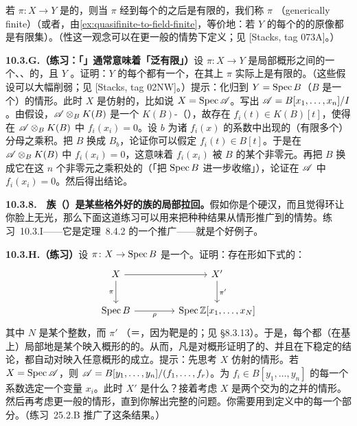 若 $\pi\colon X\to Y$ 是\trFiniteType{}的，则当 $\pi$ 经\trBaseChange{}到每个\trIrreducibleComponent{}的\trGenericPoint{}之后是有限的，我们称 $\pi$ \textbf{\trGenericallyFinite{}}（generically finite）（或者，由\cref{ex:quasifinite-to-field-finite}，等价地：若 $Y$ 的每个\trIrreducibleComponent{}的\trGenericPoint{}的原像都是有限集）。（\trGenericallyFinite{}性这一观念可以在更一般的情势下定义；见 [Stacks, tag 073A]。）

\textbf{10.3.G.（练习：「\trGenericallyFinite{}」通常意味着「泛有限」）}\quad 设 $\pi\colon X\to Y$ 是局部\trNoetherian{}概形之间的一个\trAffine、\trFiniteType、\trGenericallyFinite{}的\trMorphism，且 $Y$ \trReduced。证明：$Y$ 的每个\trGenericPoint{}都有一个\trOpen\trNeighborhood，在其上 $\pi$ 实际上是有限的。（这些假设可以大幅削弱；见 [Stacks, tag 02NW]。）提示：化归到 $Y=\operatorname{Spec} B$（$B$ 是一个\trIntegralDomain）的情形。此时 $X$ 是仿射的，比如说 $X=\operatorname{Spec}\mathscr{A}$。写出 $\mathscr{A}=B[x_1,\dots,x_n]/I$。由假设，$\mathscr{A}\otimes_B K(B)$ 是一个\trFinite{} $K(B)$-\trModule（\trFiniteDimensional{}\trVectorSpace），故存在\trMonicPolynomial{} $f_i(t)\in K(B)[t]$，使得在 $\mathscr{A}\otimes_B K(B)$ 中 $f_i(x_i)=0$。设 $b$ 为诸 $f_i(x)$ 的系数中出现的（有限多个）分母之乘积。把 $B$ 换成 $B_b$，论证你可以假定 $f_i(t)\in B[t]$。于是在 $\mathscr{A}\otimes_B K(B)$ 中 $f_i(x_i)=0$，这意味着 $f_i(x_i)$ 被 $B$ 的某个非零元\trAnnihilate。再把 $B$ 换成它在这 $n$ 个非零元之乘积处的\trLocalization（「把 $\operatorname{Spec} B$ 进一步收缩」），论证在 $\mathscr{A}$ 中 $f_i(x_i)=0$。然后得出结论。

\textbf{10.3.8.}\ \extrahard\ \textbf{\trFinitelyPresented{}族（\trMorphism）是某些格外好的族的局部拉回。}\quad 假如你是个硬汉，而且觉得\trNoetherian{}环让你脸上无光，那么下面这道练习可以用来把种种结果从\trNoetherian{}情形推广到\trLocally\trFinitelyPresented{}的情势。\mbox{练习~10.3.I}——它是\trChevalley{}定理~8.4.2 的一个推广——就是个好例子。

\textbf{10.3.H.（练习）}\quad 设 $\pi\colon X\to\operatorname{Spec} B$ 是一个\trFinitelyPresented\trMorphism。证明：存在形如下式的\trBaseChangeDiagram{}：
\[
\begin{tikzcd}[row sep=2.3em, column sep=4.2em]
X \ar[r] \ar[d, "\pi"'] & X' \ar[d, "\pi'"] \\
\Spec B \ar[r, "\rho"'] & \Spec\mathbb{Z}[x_1,\dots,x_N]
\end{tikzcd}
\]
其中 $N$ 是某个整数，而 $\pi'$ \trFinitelyPresented{}（＝\trFiniteType，因为靶是\trNoetherian{}的；见 \S8.3.13）。于是，每个\trFinitelyPresented\trMorphism{}都（在基上）局部地是某个映入\trNoetherian{}概形的\trFiniteType\trMorphism{}的\trPullback。从而，凡是对\trNoetherian{}概形证明了的、并且在\trBaseChange{}下稳定的结论，都自动对映入任意概形的\trLocally\trFinitelyPresented\trMorphism{}成立。提示：先思考 $X$ 仿射的情形。若 $X=\operatorname{Spec}\mathscr{A}$，则 $\mathscr{A}=B[y_1,\dots,y_n]/(f_1,\dots,f_r)$。为 $f_i\in B[y_1,\dots,y_n]$ 的每一个系数选定一个变量 $x_i$。此时 $X'$ 是什么？接着考虑 $X$ 是两个交为\trAffine\trOpenSet{}的\trAffine\trOpenSet{}之并的情形。然后再考虑更一般的情形，直到你解出完整的问题。你需要用到\trFinitelyPresented{}定义中的每一个部分。（\mbox{练习~25.2.B} 推广了这条结果。）


